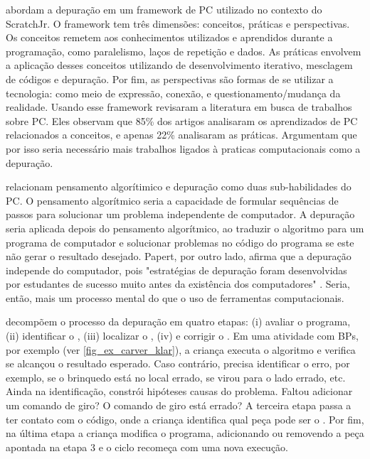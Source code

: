  abordam a depuração em um framework de PC utilizado no contexto do ScratchJr. O framework tem três dimensões: conceitos, práticas e perspectivas. Os conceitos remetem aos conhecimentos utilizados e aprendidos durante a programação, como paralelismo, laços de repetição e dados. As práticas envolvem a aplicação desses conceitos utilizando de desenvolvimento iterativo, mesclagem de códigos e depuração. Por fim, as perspectivas são formas de se utilizar a tecnologia: como meio de expressão, conexão, e questionamento/mudança da realidade. Usando esse framework  revisaram a literatura em busca de trabalhos sobre PC. Eles observam que 85\% dos artigos analisaram os aprendizados de PC relacionados a conceitos, e apenas 22\% analisaram as práticas. Argumentam que por isso seria necessário mais trabalhos ligados à praticas computacionais como a depuração.

 relacionam pensamento algorítimico e depuração como duas sub-habilidades do PC. O pensamento algorítmico seria a capacidade de formular sequências de passos para solucionar um problema independente de computador. A depuração seria aplicada depois do pensamento algorítmico, ao traduzir o algoritmo para um programa de computador e solucionar problemas no código do programa se este não gerar o resultado desejado. Papert, por outro lado, afirma que a depuração independe do computador, pois "estratégias de depuração foram desenvolvidas por estudantes de sucesso muito antes da existência dos computadores" \cite[p.23]{papert_mindstorms:_1980}. Seria, então, mais um processo mental do que o uso de ferramentas computacionais.

 decompõem o processo da depuração em quatro etapas: (i) avaliar o programa, (ii) identificar o \bug, (iii) localizar o \bug, (iv) e corrigir o \bug. Em uma atividade com BPs, por exemplo (ver \autoref{fig_ex_carver_klar}), a criança executa o algoritmo e verifica se alcançou o resultado esperado. Caso contrário, precisa identificar o erro, por exemplo, se o brinquedo está no local errado, se virou para o lado errado, etc. Ainda na identificação, constrói hipóteses causas do problema. Faltou adicionar um comando de giro? O comando de giro está errado? A terceira etapa passa a ter contato com o código, onde a criança identifica qual peça pode ser o \bug. Por fim, na última etapa a criança modifica o programa, adicionando ou removendo a peça apontada na etapa 3 e o ciclo recomeça com uma nova execução.

